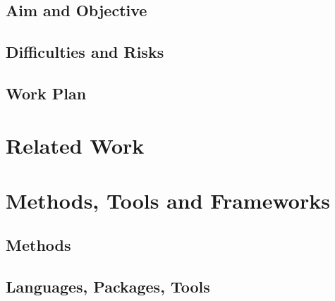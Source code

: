 \documentclass[11pt]{article}
\begin{document}
\subsection{Aim and Objective} 

\subsection{Difficulties and Risks}


\subsection{Work Plan}


\section{Related Work}

\section{Methods, Tools and Frameworks}

\subsection{Methods}

   



             
\subsection{Languages, Packages, Tools}
\end{document}
